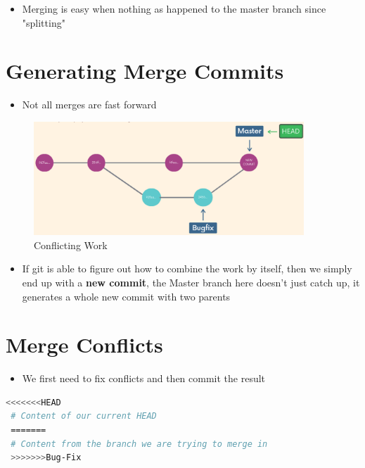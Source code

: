 \documentclass{report}
\begin{document}
\begin{itemize}
	\item Merging is easy when nothing as happened to the master branch since "splitting"
\end{itemize}


\section{Generating Merge Commits}
\begin{itemize}
	\item Not all merges are fast forward
\end{itemize}
\begin{figure}[H] 
	 \centering 
	 \includegraphics[width=4in]{screenshots/2022-07-01T21-35-16Z.png} 
	 \caption{Conflicting Work} 
 \end{figure}

 \begin{itemize}
	 \item If git is able to figure out how to combine the work by itself, then we simply end up with a \textbf{new commit}, the Master branch here doesn't just catch up, it generates a whole new commit with two parents
 \end{itemize}


 \section{Merge Conflicts}

 \begin{itemize}
 	\item We first need to fix conflicts and then commit the result
 \end{itemize}

 \begin{tcolorbox}[title=Conflicts Markers,colback=backcolour]
 \begin{lstlisting}[language=bash]
 <<<<<<<HEAD
 # Content of our current HEAD
 =======
 # Content from the branch we are trying to merge in
 >>>>>>>Bug-Fix
 \end{lstlisting}
 \end{tcolorbox}
\end{document}
